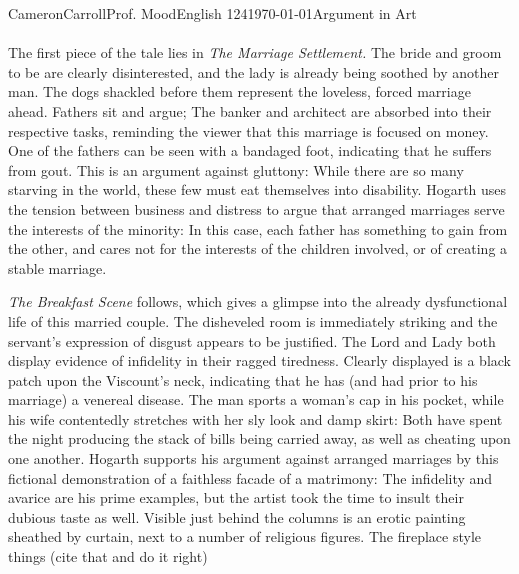 \documentclass[12pt,letterpaper]{article}
\begin{document}
\begin{mla}{Cameron}{Carroll}{Prof. Mood}{English 124}{\today}{Argument in Art}
\paragraph{} The first piece of the tale lies in \emph{The Marriage Settlement.} The bride and groom to be are clearly disinterested, and the lady is already being soothed by another man. The dogs shackled before them represent the loveless, forced marriage ahead. Fathers sit and argue; The banker and architect are absorbed into their respective tasks, reminding the viewer that this marriage is focused on money. One of the fathers can be seen with a bandaged foot, indicating that he suffers from gout. This is an argument against gluttony: While there are so many starving in the world, these few must eat themselves into disability. Hogarth uses the tension between business and distress to argue that arranged marriages serve the interests of the minority: In this case, each father has something to gain from the other, and cares not for the interests of the children involved, or of creating a stable marriage.

\emph{The Breakfast Scene} follows, which gives a glimpse into the already dysfunctional life of this married couple. The disheveled room is immediately striking and the servant's expression of disgust appears to be justified. The Lord and Lady both display evidence of infidelity in their ragged tiredness. Clearly displayed is a black patch upon the Viscount's neck, indicating that he has (and had prior to his marriage) a venereal disease. The man sports a woman's cap in his pocket, while his wife contentedly stretches with her sly look and damp skirt: Both have spent the night producing the stack of bills being carried away, as well as cheating upon one another. Hogarth supports his argument against arranged marriages by this fictional demonstration of a faithless facade of a matrimony: The infidelity and avarice are his prime examples, but the artist took the time to insult their dubious taste as well. Visible just behind the columns is an erotic painting sheathed by curtain, next to a number of religious figures. The fireplace style things (cite that and do it right)


\end{mla}
\end{document}
